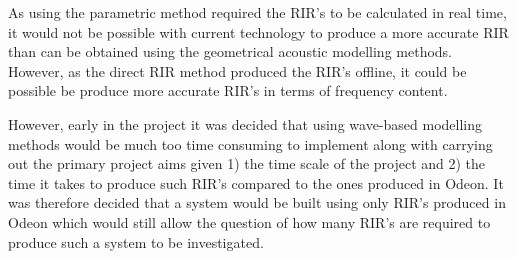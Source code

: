 \documentclass[../../main.tex]{subfiles}
\begin{document}
		As using the parametric method required the \ac{RIR}'s to be calculated in real time, it would not be possible with current technology to produce a more accurate \ac{RIR} than can be obtained using the geometrical acoustic modelling methods. However, as the direct \ac{RIR} method produced the \ac{RIR}'s offline, it could be possible be produce more accurate \ac{RIR}'s in terms of frequency content.

		However, early in the project it was decided that using wave-based modelling methods would be much too time consuming to implement along with carrying out the primary project aims given 1) the time scale of the project and 2) the time it takes to produce such \ac{RIR}'s compared to the ones produced in Odeon. It was therefore decided that a system would be built using only \ac{RIR}'s produced in Odeon which would still allow the question of how many \ac{RIR}'s are required to produce such a system to be investigated.



	

		
\end{document}
